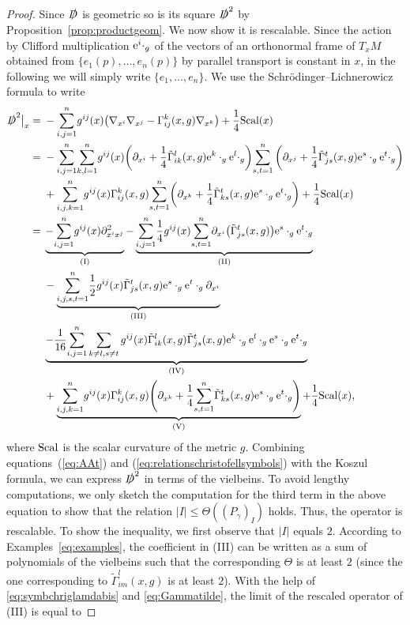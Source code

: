 \documentclass[pdftex]{sigma}
\numberwithin{equation}{section}
\theoremstyle{definition}
\begin{document}
\begin{proof} Since $\slashed D$ is geometric so is its square $\slashed D^2$ by Proposition~\ref{prop:productgeom}. We now show it is rescalable. Since the action by Clifford multiplication ${\rm e}^i\cdot_g$ of the vectors of an orthonormal frame of $T_xM$ obtained from $\{e_1(p),\dots,e_n(p)\}$ by parallel transport is constant in $x$, in the following we will simply write $\{e_1 ,\dots,e_n \}$. We use the Schr\"odinger--Lichnerowicz formula \cite{LM} to write
 \begin{align*}
 \slashed 	D^2\big|_x={}&-{\sum_{i,j=1}^n}g^{ij}(x)\bigl(\nabla_{x^i}\nabla_{x^j}-\Gamma_{ij}^k(x, g)\nabla_{x^k}\bigr)+\frac{1}{4}{\rm Scal}(x)\\
 ={}&-{\sum_{i,j=1}^n}{\sum_{k,l=1}^n}g^{ij}(x)\biggl(\partial_{x^i}+\frac{1}{4}\tilde\Gamma_{i k}^l(x,g) {\rm e}^k\cdot_g {\rm e}^l\cdot_g\biggr) {\sum_{s,t=1}^n}\left(\partial_{x^j}+\frac{1}{4}\tilde\Gamma_{j s}^{t}(x,g) {\rm e}^{s}\cdot_g {\rm e}^{t}\cdot_g\right)\\
 &{} +{\sum_{i,j, k=1}^n} g^{ij}(x)\Gamma_{ij}^k(x,g){\sum_{s,t=1}^n}\biggl(\partial_{x^k}+\frac{1}{4}\tilde\Gamma_{k s}^{t}(x, g){\rm e}^s\cdot_g {\rm e}^t\cdot_g\biggr)+\frac{1}{4}{\rm Scal}(x)\\
 ={}&\underbrace{-{\sum_{i,j=1}^n}g^{ij}(x)\partial^2_{x^i x^j}}_{\rm (I)}-\underbrace{{\sum_{i,j=1}^n}\frac{1}{4}g^{ij}(x){\sum_{s, t=1}^n}\partial_{x^i}\bigl(\tilde\Gamma_{j s}^{t}(x,g)\bigr){\rm e}^s\cdot_g {\rm e}^{t}\cdot_g}_{\rm (II)}\\
 &{}-\underbrace{{\sum_{i,j, s,t=1}^n}\frac{1}{2}g^{ij}(x)\tilde\Gamma_{js}^{t}(x,g) {\rm e}^{s}\cdot_g {\rm e}^{t}\cdot_g\partial_{x^i}}_{\rm (III)}\\
 &{} \underbrace{-\frac{1}{16}{\sum_{i,j=1}^n}\sum_{k\neq l, s\neq t} g^{ij}(x)\tilde\Gamma_{i k}^l(x,g)\tilde\Gamma_{j s}^{t}(x,g){\rm e}^k\cdot_g {\rm e}^l\cdot_g {\rm e}^{s}\cdot_g {\rm e}^{t}\cdot_g}_{\rm (IV)}\\
 &{}+\underbrace{{\sum_{i,j, k=1}^n}g^{ij}(x)\Gamma_{ij}^k(x,g)\Biggl(\partial_{x^k}+\frac{1}{4}{\sum_{s,t=1}^n}\tilde\Gamma_{k s}^{t}(x, g){\rm e}^s\cdot_g {\rm e}^t\cdot_g\Biggr)}_{\rm (V)}+\frac{1}{4}{\rm Scal}(x),
 \end{align*}
 where ${\rm Scal}$ is the scalar curvature of the metric $g$. Combining equations~(\ref{eq:AAt}) and (\ref{eq:relationschristofellsymbols}) with the Koszul formula, we can express $\slashed D^2$ in terms of the vielbeins. To avoid lengthy computations, we only sketch the computation for the third term in the above equation to show that the relation $|I|\leq \Theta(({P_\gamma})_I)$ holds. Thus, the operator is rescalable. To show the inequality, we first observe that $|I|$ equals $2$. According to Examples~\ref{eq:examples}, the coefficient in (III) can be written as a sum of polynomials of the vielbeins such that the corresponding $\Theta$ is at least $2$ \big(since the one corresponding to $\tilde{\Gamma}_{i m}^l(x,g)$ is at least $2$\big). With the help of \eqref{eq:symbchriglamdabis} and \eqref{eq:Gammatilde}, the limit of the rescaled operator of (III) is equal to

\end{proof}
\end{document}
